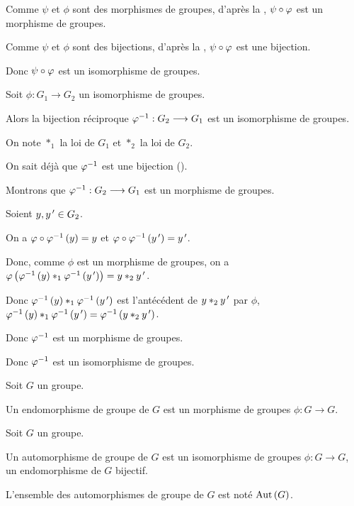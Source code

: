 \begin{dem}
Comme \(\psi\) et \(\phi\) sont des morphismes de groupes, d'après la , \(\psi\circ\varphi\) est un morphisme de groupes.

Comme \(\psi\) et \(\phi\) sont des bijections, d'après la , \(\psi\circ\varphi\) est une bijection.

Donc \(\psi\circ\varphi\) est un isomorphisme de groupes.
\end{dem}

\begin{theo}
Soit \(\phi:G_1\to G_2\) un isomorphisme de groupes.

Alors la bijection réciproque \(\varphi^{-1}:G_2\longrightarrow G_1\) est un isomorphisme de groupes.
\end{theo}

\begin{dem}
On note \(*_1\) la loi de \(G_1\) et \(*_2\) la loi de \(G_2\).

On sait déjà que \(\varphi^{-1}\) est une bijection ().

Montrons que \(\varphi^{-1}:G_2\longrightarrow G_1\) est un morphisme de groupes.

Soient \(y,y^{\,\prime}\in G_2\).

On a \(\varphi\circ\varphi^{-1}\left(y\right)=y\) et \(\varphi\circ\varphi^{-1}\left(y^{\,\prime}\right)=y^{\,\prime}\).

Donc, comme \(\phi\) est un morphisme de groupes, on a \(\varphi\left(\varphi^{-1}\left(y\right)*_1\varphi^{-1}\left(y^{\,\prime}\right)\right)=y*_2y^{\,\prime}\).

Donc \(\varphi^{-1}\left(y\right)*_1\varphi^{-1}\left(y^{\,\prime}\right)\) est l'antécédent de \(y*_2y^{\,\prime}\) par \(\phi\), \cad \(\varphi^{-1}\left(y\right)*_1\varphi^{-1}\left(y^{\,\prime}\right)=\varphi^{-1}\left(y*_2y^{\,\prime}\right)\).

Donc \(\varphi^{-1}\) est un morphisme de groupes.

Donc \(\varphi^{-1}\) est un isomorphisme de groupes.
\end{dem}

\begin{defi}[Endomorphisme]
Soit \(G\) un groupe.

Un endomorphisme de groupe de \(G\) est un morphisme de groupes \(\phi:G\to G\).
\end{defi}

\begin{defi}[Automorphisme]
Soit \(G\) un groupe.

Un automorphisme de groupe de \(G\) est un isomorphisme de groupes \(\phi:G\to G\), \cad un endomorphisme de \(G\) bijectif.

L'ensemble des automorphismes de groupe de \(G\) est noté \(\operatorname{Aut}\left(G\right)\).
\end{defi}

